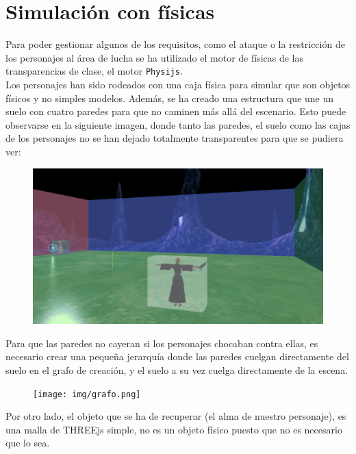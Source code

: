 \documentclass[11pt,a4paper]{article}
\begin{document}
\section{Simulación con físicas}

Para poder gestionar algunos de los requisitos, como el ataque o la restricción de los personajes al área de lucha se ha utilizado el motor de físicas de las transparencias de clase, el motor \texttt{Physijs}.\\

Los personajes han sido rodeados con una caja física para simular que son objetos físicos y no simples modelos. 
Además, se ha creado una estructura que une un suelo con cuatro paredes para que no caminen más allá del escenario. Esto puede observarse en la siguiente imagen, donde tanto las paredes, el suelo como las cajas de los personajes no se han dejado totalmente transparentes para que se pudiera ver:

\begin{figure}[H]
	\centering
	\includegraphics[scale=0.23]{img/fisica.png}
\end{figure}

Para que las paredes no cayeran si los personajes chocaban contra ellas, es necesario crear una pequeña jerarquía donde las paredes cuelgan directamente del suelo en el grafo de creación, y el suelo a su vez cuelga directamente de la escena.

\begin{figure}[H]
	\centering
	\texttt{[image: img/grafo.png]}
\end{figure}

Por otro lado, el objeto que se ha de recuperar (el alma de nuestro personaje), es una malla de THREEjs simple, no es un objeto físico puesto que no es necesario que lo sea.\\
\end{document}
